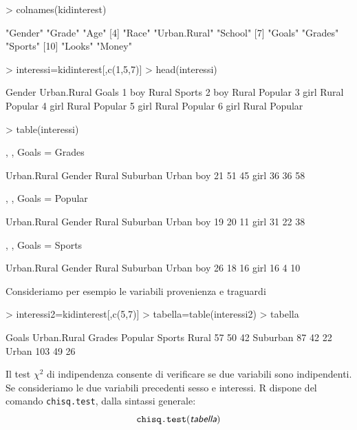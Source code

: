 \documentclass[onecolumn,11pt]{book}
\newcommand{\varia}[1]{\textsl{\textsf{#1}}}
\begin{document}
\begin{Schunk}
\begin{Sinput}
> colnames(kidinterest)
\end{Sinput}
\begin{Soutput}
 [1] "Gender"      "Grade"       "Age"        
 [4] "Race"        "Urban.Rural" "School"     
 [7] "Goals"       "Grades"      "Sports"     
[10] "Looks"       "Money"      
\end{Soutput}
\begin{Sinput}
> interessi=kidinterest[,c(1,5,7)]
> head(interessi)
\end{Sinput}
\begin{Soutput}
  Gender Urban.Rural   Goals
1    boy       Rural  Sports
2    boy       Rural Popular
3   girl       Rural Popular
4   girl       Rural Popular
5   girl       Rural Popular
6   girl       Rural Popular
\end{Soutput}
\begin{Sinput}
> table(interessi)
\end{Sinput}
\begin{Soutput}
, , Goals = Grades

      Urban.Rural
Gender Rural Suburban Urban
  boy     21       51    45
  girl    36       36    58

, , Goals = Popular

      Urban.Rural
Gender Rural Suburban Urban
  boy     19       20    11
  girl    31       22    38

, , Goals = Sports

      Urban.Rural
Gender Rural Suburban Urban
  boy     26       18    16
  girl    16        4    10
\end{Soutput}
\end{Schunk}
 Consideriamo per esempio le variabili provenienza e traguardi
\begin{Schunk}
\begin{Sinput}
> interessi2=kidinterest[,c(5,7)]
> tabella=table(interessi2)
> tabella
\end{Sinput}
\begin{Soutput}
           Goals
Urban.Rural Grades Popular Sports
   Rural        57      50     42
   Suburban     87      42     22
   Urban       103      49     26
\end{Soutput}
\end{Schunk}
Il test $\chi^2$  di indipendenza consente di  verificare se  due variabili sono indipendenti. 
Se consideriamo le due variabili precedenti sesso e interessi.
\textsf{R}  dispone del comando \texttt{chisq.test}, 
dalla sintassi generale:$$\texttt{chisq.test}(\varia{tabella})$$
\end{document}
